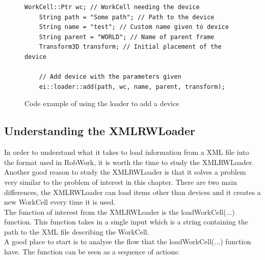 \begin{figure}[h]
	\centering
	\lstset{language=C++} 
	\begin{lstlisting}[frame=single]
	WorkCell::Ptr wc; // WorkCell needing the device
	String path = "Some path"; // Path to the device
	String name = "test"; // Custom name given to device
	String parent = "WORLD"; // Name of parent frame
	Transform3D transform; // Initial placement of the device
	
	// Add device with the parameters given
	ei::loader::add(path, wc, name, parent, transform);
	\end{lstlisting}
	\caption{Code example of using the loader to add a device}
	\label{fig:UseCodeExampleLoader}
\end{figure}


\subsection{Understanding the XMLRWLoader}
\label{subsec:XMLRWLoader}
In order to understand what it takes to load information from a XML file into the format used in RobWork, it is worth the time to study the XMLRWLoader. Another good reason to study the XMLRWLoader is that it solves a problem very similar to the problem of interest in this chapter. There are two main differences, the XMLRWLoader can load items other than devices and it creates a new WorkCell every time it is used.\\

The function of interest from the XMLRWLoader is the loadWorkCell(...) function. This function takes in a single input which is a string containing the path to the XML file describing the WorkCell.\\
A good place to start is to analyse the flow that the loadWorkCell(...) function have. The function can be seen as a sequence of actions:

